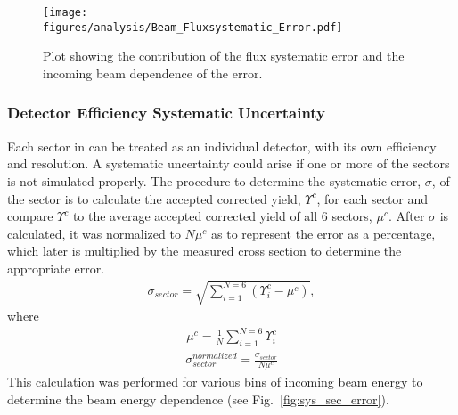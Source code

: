 \begin{figure}[h!]\begin{center}
\texttt{[image: \\figures/analysis/Beam\_Fluxsystematic\_Error.pdf]}
\caption[Plot showing the contribution of the flux systematic error and the incoming beam dependence of the error]{\label{fig:sys_flux_error} Plot showing the contribution of the flux systematic error and the incoming beam dependence of the error.}
\end{center}\end{figure}
\FloatBarrier


 
\subsubsection{Detector Efficiency Systematic Uncertainty}
Each sector in  can be treated as an individual detector, with its own efficiency and resolution. A systematic uncertainty could arise if one or more of the sectors is not simulated properly. The procedure to determine the systematic error, $\sigma$, of the sector is to calculate the accepted corrected yield, $\Upsilon^c$, for each sector and compare $\Upsilon^c$ to the average accepted corrected yield of all 6 sectors, $\mu^c$. After $\sigma$ is calculated, it was normalized to $N \mu^c$ as to represent the error as a percentage, which later is multiplied by the measured cross section to determine the appropriate error. 
\begin{align}
\sigma_{sector} = \sqrt{\sum_{i=1}^{N = 6}\left(\Upsilon_i^c - \mu^c\right)},
\end{align}
where
\begin{align}
\mu^c = \frac{1}{N}\sum_{i=1}^{N=6}\Upsilon_i^c
\end{align}
\begin{align}
\sigma_{sector}^{normalized} = \frac{\sigma_{sector}}{N\mu^c}
\end{align}
This calculation was performed for various bins of incoming beam energy to determine the beam energy dependence (see Fig.~\ref{fig:sys_sec_error}).

